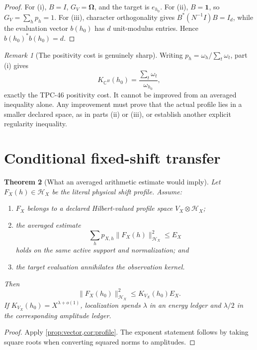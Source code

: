 \documentclass[11pt]{article}
\newtheorem{theorem}{Theorem}[section]
\theoremstyle{definition}
\theoremstyle{remark}
\newtheorem{remark}[theorem]{Remark}
\newcommand{\C}{\mathbb C}
\newcommand{\one}{\mathbf 1}
\newcommand{\Om}{\boldsymbol\Omega}
\begin{document}
\begin{proof}
For (i), \(B=I\), \(G_V=\Om\), and the target is \(e_{h_0}\).
For (ii), \(B=\one\), so \(G_V=\sum_hp_h=1\).
For (iii), character orthogonality gives
\(B^*(N^{-1}I)B=I_d\), while the evaluation vector \(b(h_0)\)
has \(d\) unit-modulus entries.  Hence
\(b(h_0)^*b(h_0)=d\).
\end{proof}

\begin{remark}[The positivity cost is genuinely sharp]
Writing \(p_h=\omega_h/\sum_t\omega_t\), part (i) gives
\[
 K_{\C^H}(h_0)=\frac{\sum_t\omega_t}{\omega_{h_0}},
\]
exactly the TPC-46 positivity cost.  It cannot be improved from an
averaged inequality alone.  Any improvement must prove that the
actual profile lies in a smaller declared space, as in parts (ii) or
(iii), or establish another explicit regularity inequality.
\end{remark}

\section{Conditional fixed-shift transfer}

\begin{theorem}[What an averaged arithmetic estimate would imply]
\label{thm:conditional}
Let \(F_X(h)\in\mathcal H_X\) be the literal physical shift profile.
Assume:
\begin{enumerate}[label=(\alph*),leftmargin=2em]
\item \(F_X\) belongs to a declared Hilbert-valued profile space
  \(V_X\otimes\mathcal H_X\);
\item the averaged estimate
  \[
   \sum_h p_{X,h}\|F_X(h)\|_{\mathcal H_X}^2\le E_X
  \]
  holds on the same active support and normalization; and
\item the target evaluation annihilates the observation kernel.
\end{enumerate}
Then
\[
 \boxed{\qquad
 \|F_X(h_0)\|_{\mathcal H_X}^2
 \le K_{V_X}(h_0)E_X.
 \qquad}
\]
If \(K_{V_X}(h_0)=X^{\lambda+o(1)}\), localization spends
\(\lambda\) in an energy ledger and \(\lambda/2\) in the corresponding
amplitude ledger.
\end{theorem}

\begin{proof}
Apply \cref{prop:vector,cor:profile}.  The exponent statement follows
by taking square roots when converting squared norms to amplitudes.
\end{proof}
\end{document}
